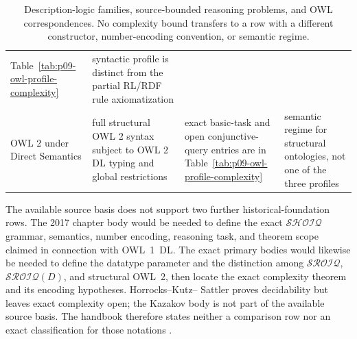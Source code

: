 \begin{table}[htbp]
\begin{tabularx}{\textwidth}{@{}l X X X@{}}
Table~\ref{tab:p09-owl-profile-complexity} & syntactic profile is distinct from
the partial RL/RDF rule axiomatization \cite{W3COWL2Profiles2012} \\
OWL 2 under Direct Semantics & full structural OWL 2 syntax subject to OWL 2 DL
typing and global restrictions & exact basic-task and open conjunctive-query
entries are in Table~\ref{tab:p09-owl-profile-complexity} & semantic regime for
structural ontologies, not one of the three profiles
\cite{W3COWL2DirectSemantics2012,W3COWL2Profiles2012} \\
\bottomrule
\end{tabularx}
\caption{Description-logic families, source-bounded reasoning problems, and OWL
correspondences.  No complexity bound transfers to a row with a different
constructor, number-encoding convention, or semantic regime.}
\label{tab:p09-description-logic-family}
\end{table}

The available source basis does not support two further historical-foundation
rows.  The 2017 chapter body would be needed to define the exact
\(\mathcal{SHOIQ}\) grammar, semantics, number encoding, reasoning task, and
theorem scope claimed in connection with OWL~1~DL.  The exact primary bodies
would likewise be needed to define the datatype parameter and the distinction
among \(\mathcal{SROIQ}\), \(\mathcal{SROIQ}(D)\), and structural OWL~2, then locate
the exact complexity theorem and its encoding hypotheses.  Horrocks--Kutz--
Sattler proves decidability but leaves exact complexity open; the Kazakov body
is not part of the available source basis.  The handbook therefore states
neither a comparison row nor an exact classification for those
notations \cite{HorrocksKutzSattler2006,Kazakov2008,
BaaderHorrocksLutzSattler2017}.

